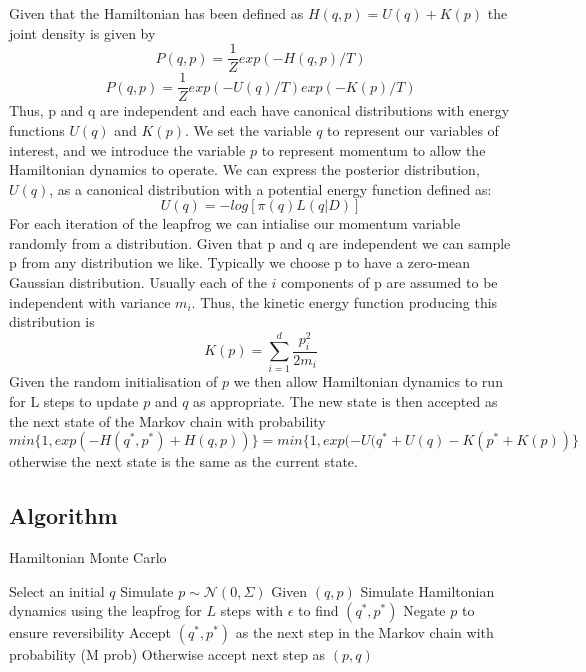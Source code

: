 \documentclass[11pt]{article}
\begin{document}
Given that the Hamiltonian has been defined as $H(q,p) = U(q) + K(p)$ the joint density is given by
\begin{equation}
P(q,p) = \frac{1}{Z}exp(-H(q,p)/T)
\end{equation}
\begin{equation}
P(q,p) = \frac{1}{Z}exp(-U(q)/T)exp(-K(p)/T)
\end{equation}
Thus, p and q are independent and each have canonical distributions with energy functions $U(q)$ and $K(p)$. We set the variable $q$ to represent our variables of interest, and we introduce the variable $p$ to represent momentum to allow the Hamiltonian dynamics to operate. We can express the posterior distribution, $U(q)$, as a canonical distribution with a potential energy function defined as:
\begin{equation}
U(q) = -log[\pi(q)L(q|D)]
\end{equation}
For each iteration of the leapfrog we can intialise our momentum variable randomly from a distribution. Given that p and q are independent we can sample p from any distribution we like. Typically we choose p to have a zero-mean Gaussian distribution. Usually each of the $i$ components of p are assumed to be independent with variance $m_{i}$. Thus, the kinetic energy function producing this distribution is
\begin{equation}
K(p) = \sum_{i=1}^{d} \frac{p_{i}^{2}}{2m_{i}}
\end{equation}
Given the random initialisation of $p$ we then allow Hamiltonian dynamics to run for L steps to update $p$ and $q$ as appropriate. The new state is then accepted as the next state of the Markov chain with probability
\begin{equation}
min\{1,exp(-H(q^{*},p^{*})+H(q,p))\} = min\{1, exp(-U(q^{*}+U(q)-K(p^{*}+K(p))\}
\end{equation}
otherwise the next state is the same as the current state.
\subsection{Algorithm}
\begin{algorithm}
\caption{Hamiltonian Monte Carlo}\label{euclid}
\begin{algorithmic}[1] 
\State Select an initial $q$ 
\State Simulate $p\sim \mathcal{N}(0,\Sigma)$
\State Given $(q,p)$ Simulate Hamiltonian dynamics using the leapfrog for $L$ steps with $\epsilon$ to find $(q^{*},p^{*})$ 
\State Negate $p$ to ensure reversibility 
\State Accept $(q^{*}, p^{*})$ as the next step in the Markov chain with probability (M prob) 
\State Otherwise accept next step as $(p,q)$ 
\end{algorithmic}
\end{algorithm}
\end{document}
